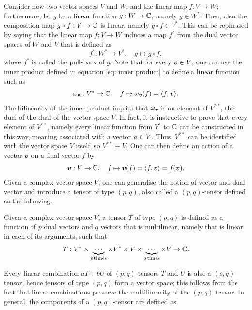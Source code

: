 Consider now two vector spaces $V$ and $W$, and the linear map $f : V \to W$; furthermore, let $g$ be a linear function $g : W \to \mathbb{C}$, namely $g \in W^*$. Then, also the composition map $g \circ f : V \to \mathbb{C}$ is linear, namely $g \circ f \in V^*$. This can be rephrased by saying that the linear map $f : V \to W$ induces a map $f^*$ from the dual vector spaces of $W$ and $V$ that is defined as
\begin{equation}
    f^* : W^* \to V^*,\quad g \mapsto g \circ f,
\end{equation}
where $f^*$ is called the pull-back of $g$. Note that for every $\bm{v} \in V$, one can use the inner product defined in equation \eqref{eq: inner product} to define a linear function such as
\begin{equation}
    \omega_{\bm{v}} : V^* \to \mathbb{C},\quad f \mapsto \omega_{\bm{v}}(f) = \langle f , \bm{v} \rangle.
\end{equation}
The bilinearity of the inner product implies that $\omega_{\bm{v}}$ is an element of $V^{**}$, the dual of the dual of the vector space $V$. In fact, it is instructive to prove that every element of $V^{**}$, namely every linear function from $V^*$ to $\mathbb{C}$ can be constructed in this way, meaning associated with a vector $\bm{v} \in V$. Thus, $V^{**}$ can be identified with the vector space $V$ itself, so $V^{**} \equiv V$. One can then define an action of a vector $\bm{v}$ on a dual vector $f$ by
\begin{equation}
    \bm{v} : V \to \mathbb{C},\quad f \mapsto \bm{v}(f) = \langle f , \bm{v} \rangle = f(\bm{v}).
\end{equation}
Given a complex vector space $V$, one can generalise the notion of vector and dual vector and introduce a tensor of type $(p,q)$, also called a $(p,q)$-tensor defined as the following. 
\begin{defn}[$(p,q)$-tensor]
    Given a complex vector space $V$, a tensor $T$ of type $(p,q)$ is defined as a function of $p$ dual vectors and $q$ vectors that is multilinear, namely that is linear in each of its arguments, such that 
    \begin{equation}
        T : V^* \times \underbrace{\cdots}_{p\,\mathrm{times}} \times V^* \times V \times \underbrace{\cdots}_{q\,\mathrm{times}} \times V \to \mathbb{C}.
    \end{equation}
\end{defn}
Every linear combination $aT + bU$ of $(p,q)$-tensors $T$ and $U$ is also a $(p,q)$-tensor, hence tensors of type $(p,q)$ form a vector space; this follows from the fact that linear combinations preserve the multilinearity of the $(p,q)$-tensor. In general, the components of a $(p,q)$-tensor are defined as
